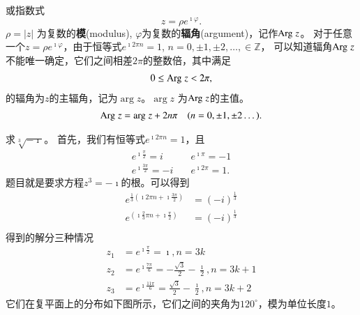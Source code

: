 或指数式
\begin{equation}
    z = \rho e^{\imath \varphi} .
\end{equation}
$\rho = |z|$ 为复数的{\bf 模}(modulus), $\varphi$为复数的{\bf 辐角}(argument)，记作${\mathrm{Arg}\;} z$。
对于任意一个$z=\rho e^{\imath \varphi}$，由于恒等式$e^{\imath 2\pi n} = 1$, $n = 0, \pm 1, \pm 2, \dots, \in \mathbb{Z}$，
可以知道辐角${\mathrm{Arg}\;} z$不能唯一确定，它们之间相差$2\pi$的整数倍，其中满足
\begin{align}
    0 \leq {\mathrm{Arg}\;} z < 2\pi ,
\end{align}
的辐角为$z$的主辐角，记为$\arg z$。$\arg z$ 为${\mathrm{Arg}\;} z$的主值。
\begin{align}
    {\mathrm{Arg}\;} z = {\mathrm{arg}\;} z + 2 n \pi \quad (n = 0, \pm 1, \pm 2\dots).
\end{align}


\begin{examplebox}{求$\sqrt[3]{-\imath}$。}
    首先，我们有恒等式$e^{\imath 2\pi n} = 1$，且
    \begin{align*}
        e^{\imath \frac{\pi}{2}}  = i & \quad  e^{\imath \pi}  =-1 \\
        e^{\imath \frac{3\pi}{2}} = -i & \quad e^{\imath 2\pi} = 1.
    \end{align*}
题目就是要求方程$z^3 =-\imath$的根。可以得到
    \begin{align*}
        e^{\frac{1}{3}(\imath 2\pi n + \imath \frac{3\pi}{2})} & = (-i)^{\frac{1}{3}} \\
        e^{(\imath \frac{2}{3}\pi n + \imath \frac{\pi}{2})}   & =  (-i)^{\frac{1}{3}} \\
    \end{align*}
得到的解分三种情况
    \begin{align*}
        z_1 &=e^{\imath \frac{\pi}{2}} = \imath , n = 3k \\
        z_2 &=e^{\imath \frac{7\pi}{6}} = -\frac{\sqrt{3}}{2} - \frac{\imath}{2} , n = 3k +1 \\
        z_3 &=e^{\imath \frac{11\pi}{6}} = \frac{\sqrt{3}}{2} - \frac{\imath}{2} , n = 3k +2 
    \end{align*}
它们在复平面上的分布如下图所示，它们之间的夹角为$120^\circ$，模为单位长度$1$。
        \centering 
        
\end{examplebox}

